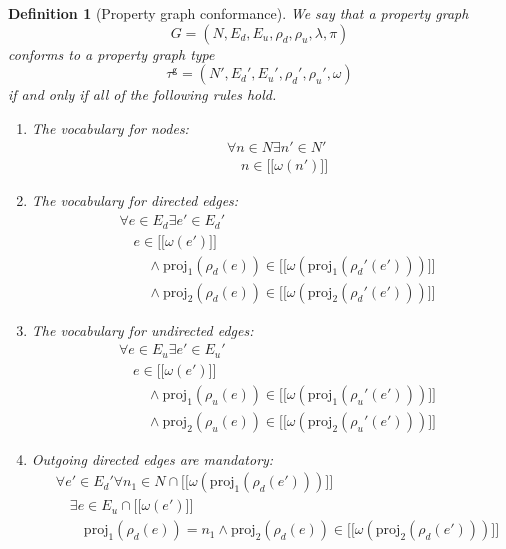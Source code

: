 \documentclass[a4paper]{article}
\newtheorem{definition}[theorem]{Definition}
\newcommand{\proj}{\mathrm{proj}}
\newcommand{\gtype}{\tau^\mathsf{g}}
\newcommand{\lsem}{\ensuremath{[\![}}
\newcommand{\rsem}{\ensuremath{]\!]}}
\newcommand{\sem}[1]{\ensuremath{\lsem #1 \rsem}}
\begin{document}
\begin{definition}[Property graph conformance]
  We say that a property graph \[G = (N, E_d, E_u, \rho_d, \rho_u, \lambda, \pi)\] \emph{conforms} to a property graph type \[\gtype = (N', E_d', E_u', \rho_d', \rho_u', \omega)\] if and only if all of the following rules hold.

  \begin{enumerate}
    \item The vocabulary for nodes:
    \begin{align*}
      &\forall n \in N \exists n' \in N'\\
      &\quad n \in \sem{\omega(n')}
    \end{align*}
    
    \item The vocabulary for directed edges:
    \begin{align*}
      &\forall e \in E_d \exists e' \in E_d'\\
      &\quad e \in \sem{\omega(e')}\\
      &\quad\quad\wedge \proj_1(\rho_d(e)) \in \sem{\omega(\proj_1(\rho_d'(e')))}\\
      &\quad\quad\wedge \proj_2(\rho_d(e)) \in \sem{\omega(\proj_2(\rho_d'(e')))}
    \end{align*}

    \item The vocabulary for undirected edges:
    \begin{align*}
      &\forall e \in E_u \exists e' \in E_u'\\
      &\quad e \in \sem{\omega(e')}\\
      &\quad\quad\wedge \proj_1(\rho_u(e)) \in \sem{\omega(\proj_1(\rho_u'(e')))}\\
      &\quad\quad\wedge \proj_2(\rho_u(e)) \in \sem{\omega(\proj_2(\rho_u'(e')))}
    \end{align*}
    
    \item Outgoing directed edges are mandatory:
    \begin{align*}
      &\forall e' \in E_d' \forall n_1 \in N \cap \sem{\omega(\proj_1(\rho_d(e')))}\\
      &\quad\exists e \in E_u \cap \sem{\omega(e')}\\
      &\quad\quad \proj_1(\rho_d(e)) = n_1 \wedge \proj_2(\rho_d(e)) \in \sem{\omega(\proj_2(\rho_d(e')))}
    \end{align*}


\end{enumerate}
\end{definition}
\end{document}
